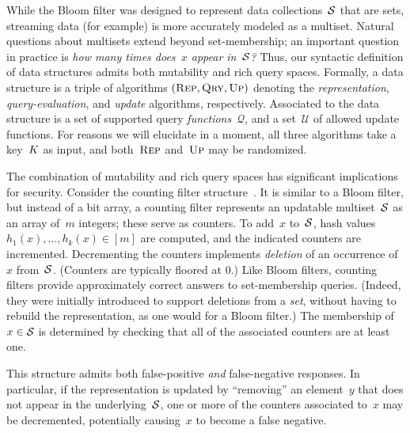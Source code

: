 %
While the Bloom filter was designed to represent data collections~$\mathcal{S}$
that are sets, streaming data (for example) is more accurately 
modeled as a multiset.  Natural questions about multisets extend beyond set-membership; an
important question in practice is \emph{how many times does~$x$ appear
in~$\mathcal{S}$?} 
Thus, our syntactic definition of data structures admits both mutability and rich
query spaces.  Formally, a data structure is a triple of algorithms $(\textnormal{\textsc{Rep}},
\textnormal{\textsc{Qry}}, \textnormal{\textsc{Up}})$ denoting the \emph{representation}, \emph{query-evaluation}, and
\emph{update} algorithms, respectively. Associated to the data structure is a
set of supported query \emph{functions}~$\mathcal{Q}$, and a set~$\mathcal{U}$
of allowed update functions.  For reasons we will elucidate in a moment, all
three algorithms take a key~$K$ as input, and both~$\textnormal{\textsc{Rep}}$ and~$\textnormal{\textsc{Up}}$ may be
randomized.

The combination of mutability and rich query spaces has significant implications
for security. Consider the counting filter
structure~\cite{fan2000summary}.  It is similar to a Bloom filter, but 
instead of a bit array, a counting filter represents an updatable
multiset~$\mathcal{S}$ as an array of~$m$ integers; these serve as counters.
To add~$x$ to~$\mathcal{S}$, hash values $h_1(x), \ldots,
h_k(x)\in[m]$ are computed, and the indicated counters are
incremented.  Decrementing the counters implements \emph{deletion} of
an occurrence of~$x$ from~$\mathcal{S}$. (Counters are typically floored at 0.)
%
Like Bloom filters, counting filters provide approximately correct
answers to set-membership queries.  (Indeed, they were initially
introduced to support deletions from a \emph{set}, without having to
rebuild the representation, as one would for a Bloom filter.) 
The membership of~$x\in\mathcal{S}$ is determined by checking that all of the
associated counters are at least one.%
%

%
This structure admits both false-positive \emph{and} false-negative responses.
In particular, if the representation is updated by ``removing'' an element~$y$
that does not appear in the underlying~$\mathcal{S}$, one or more of the counters
associated to~$x$ may be decremented, potentially causing~$x$ to become a false
negative.


